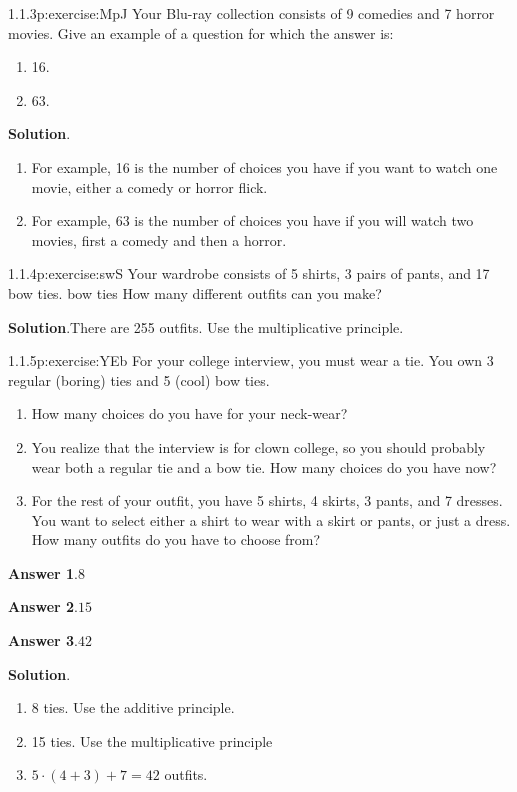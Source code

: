 \documentclass[twoside,11pt,]{book}
\newcommand{\blocktitlefont}{\relax}
\numberwithin{equation}{chapter}
\begin{document}
\begin{divisionsolution}{1.1.3}{}{p:exercise:MpJ}%
Your Blu-ray collection consists of 9 comedies and 7 horror movies. Give an example of a question for which the answer is:%
\begin{enumerate}[label=(\alph*)]
\item{}16.%
\item{}63.%
\end{enumerate}
%
\par\smallskip%
\noindent\textbf{\blocktitlefont Solution}.\quad{}%
\begin{enumerate}[label=(\alph*)]
\item{}For example, 16 is the number of choices you have if you want to watch one movie, either a comedy or horror flick.%
\item{}For example, 63 is the number of choices you have if you will watch two movies, first a comedy and then a horror.%
\end{enumerate}
%
\end{divisionsolution}%
\begin{divisionsolution}{1.1.4}{}{p:exercise:swS}%
Your wardrobe consists of 5 shirts, 3 pairs of pants, and 17 bow ties. bow ties How many different outfits can you make?%
\par\smallskip%
\noindent\textbf{\blocktitlefont Solution}.\quad{}There are 255 outfits. Use the multiplicative principle.%
\end{divisionsolution}%
\begin{divisionsolution}{1.1.5}{}{p:exercise:YEb}%
For your college interview, you must wear a tie. You own 3 regular (boring) ties and 5 (cool) bow ties.%
\begin{enumerate}[label=(\alph*)]
\item{}How many choices do you have for your neck-wear?%
\item{}You realize that the interview is for clown college, so you should probably wear both a regular tie and a bow tie. How many choices do you have now?%
\item{}For the rest of your outfit, you have 5 shirts, 4 skirts, 3 pants, and 7 dresses. You want to select either a shirt to wear with a skirt or pants, or just a dress. How many outfits do you have to choose from?%
\end{enumerate}
%
\par\smallskip%
\noindent\textbf{\blocktitlefont Answer 1}.\quad{}\(8\)%
\par\smallskip%
\noindent\textbf{\blocktitlefont Answer 2}.\quad{}\(15\)%
\par\smallskip%
\noindent\textbf{\blocktitlefont Answer 3}.\quad{}\(42\)%
\par\smallskip%
\noindent\textbf{\blocktitlefont Solution}.\quad{}%
\begin{enumerate}[label=(\alph*)]
\item{}8 ties. Use the additive principle.%
\item{}15 ties. Use the multiplicative principle%
\item{}\(5\cdot (4+3) + 7 = 42\) outfits.%
\end{enumerate}
%
\end{divisionsolution}%
\end{document}
